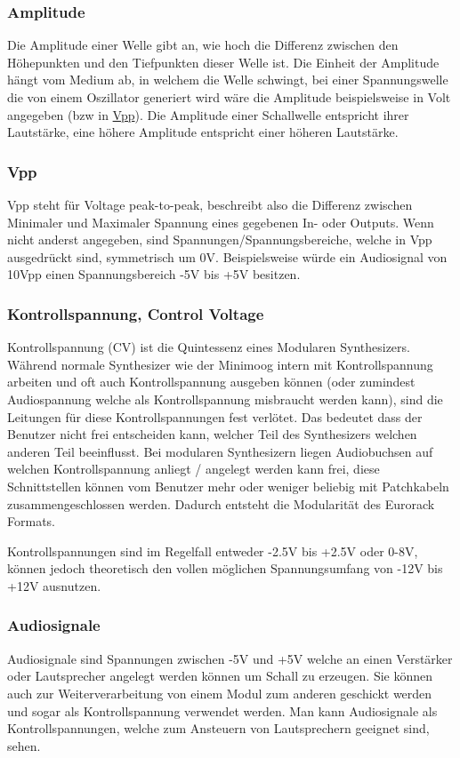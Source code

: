 \subsubsection{Amplitude}
\label{sec:org498c3ee}
Die Amplitude einer Welle gibt an, wie hoch die Differenz zwischen den Höhepunkten und den Tiefpunkten dieser Welle ist. Die Einheit der Amplitude hängt vom Medium ab, in welchem die Welle schwingt, bei einer Spannungswelle die von einem Oszillator generiert wird wäre die Amplitude beispielsweise in Volt angegeben (bzw in \hyperref[sec:org3802a3a]{Vpp}). Die Amplitude einer Schallwelle entspricht ihrer Lautstärke, eine höhere Amplitude entspricht einer höheren Lautstärke.

\subsubsection{Vpp}
\label{sec:org3802a3a}
Vpp steht für Voltage peak-to-peak, beschreibt also die Differenz zwischen Minimaler und Maximaler Spannung eines gegebenen In- oder Outputs. Wenn nicht anderst angegeben, sind Spannungen/Spannungsbereiche, welche in Vpp ausgedrückt sind, symmetrisch um 0V. Beispielsweise würde ein Audiosignal von 10Vpp einen Spannungsbereich -5V bis +5V besitzen.

\subsubsection{Kontrollspannung, Control Voltage}
\label{sec:org017e0f3}
Kontrollspannung (CV) ist die Quintessenz eines Modularen Synthesizers. Während normale Synthesizer wie der Minimoog intern mit Kontrollspannung arbeiten und oft auch Kontrollspannung ausgeben können (oder zumindest Audiospannung welche als Kontrollspannung misbraucht werden kann), sind die Leitungen für diese Kontrollspannungen fest verlötet. Das bedeutet dass der Benutzer nicht frei entscheiden kann, welcher Teil des Synthesizers welchen anderen Teil beeinflusst. Bei modularen Synthesizern liegen Audiobuchsen auf welchen Kontrollspannung anliegt / angelegt werden kann frei, diese Schnittstellen können vom Benutzer mehr oder weniger beliebig mit Patchkabeln zusammengeschlossen werden. Dadurch entsteht die Modularität des Eurorack Formats.

Kontrollspannungen sind im Regelfall entweder -2.5V bis +2.5V oder 0-8V, können jedoch theoretisch den vollen möglichen Spannungsumfang von -12V bis +12V ausnutzen.

\subsubsection{Audiosignale}
\label{sec:org03da6db}
Audiosignale sind Spannungen zwischen -5V und +5V welche an einen Verstärker oder Lautsprecher angelegt werden können um Schall zu erzeugen. Sie können auch zur Weiterverarbeitung von einem Modul zum anderen geschickt werden und sogar als Kontrollspannung verwendet werden. Man kann Audiosignale als Kontrollspannungen, welche zum Ansteuern von Lautsprechern geeignet sind, sehen.

